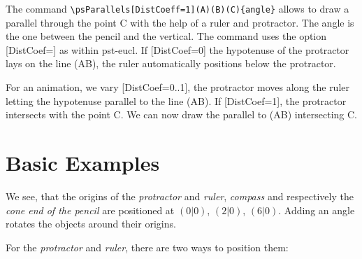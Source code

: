 \documentclass[fontsize=11pt,english,BCOR=10mm,DIV=12,bibliography=totoc,parskip=false,headings=small,
    headinclude=false,footinclude=false,oneside]{pst-doc}
\begin{document}
\begin{LTXexample}[pos=t,width=\linewidth]
\end{LTXexample}


The command \verb+\psParallels[DistCoeff=1](A)(B)(C){angle}+ allows to draw a parallel through the 
point C with the help of a ruler and protractor. The angle is the one between the pencil and the vertical. 
The command uses the option [DistCoef=] as within pst-eucl. If [DistCoef=0] the hypotenuse of the 
protractor lays on the line (AB), the ruler automatically positions below the protractor.

For an animation, we vary [DistCoef=0..1], the protractor moves along the ruler letting the 
hypotenuse parallel to the line (AB). If [DistCoef=1], the protractor intersects with the point C. 
We can now draw the parallel to (AB) intersecting C.





\newpage


\section{Basic Examples}

\begin{LTXexample}[pos=t,width=16cm]
\end{LTXexample}

We see, that the origins of the \emph{protractor} and \emph{ruler}, \emph{compass} and respectively the \emph{cone end of the pencil} are positioned at $(0|0)$, $(2|0)$, $(6|0)$. Adding an angle rotates the objects around their origins.

For the \emph{protractor} and \emph{ruler}, there are two ways to position them:
\end{document}
